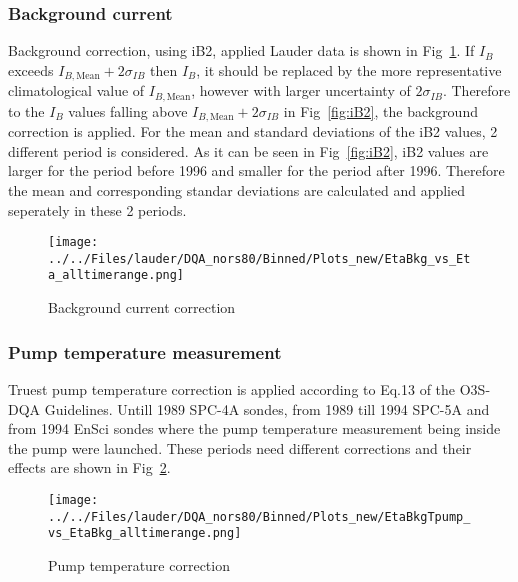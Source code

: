         \subsubsection{Background current}
        Background correction, using iB2, applied Lauder data is shown in Fig~\ref{fig:bkg}. If $I_B$ exceeds $I_{B,\text{Mean}}+2\sigma_{IB}$ then $I_B$, it
should be replaced by the more representative climatological value of $I_{B,\text{Mean}}$, however with
larger uncertainty of $2\sigma_{IB}$.
Therefore to the $I_B$ values falling above $I_{B,\text{Mean}}+2\sigma_{IB}$ in Fig~\ref{fig:iB2}, the background correction is applied. For the mean and standard deviations
of the iB2 values, 2 different period is considered. As it can be seen in Fig~\ref{fig:iB2}, iB2 values are larger for the period before 1996 and smaller for the period after
1996. Therefore the mean and corresponding standar deviations are calculated and applied seperately in these 2 periods.
%
%
                \begin{figure}
        \centering
\texttt{[image: ../../Files/lauder/DQA\_nors80/Binned/Plots\_new/EtaBkg\_vs\_Eta\_alltimerange.png]}
    \caption{Background current correction}
            \label{fig:bkg}
    \end{figure}
%
            \subsubsection{Pump temperature measurement}
 Truest pump temperature correction is applied according to Eq.13 of the O3S-DQA Guidelines. Untill 1989 SPC-4A sondes, from 1989 till 1994
 SPC-5A and from 1994 EnSci sondes where the pump temperature measurement being inside the pump  were launched.
 These periods need different corrections and their effects are shown in Fig~\ref{fig:tpump}.

%
                    \begin{figure}
        \centering
\texttt{[image: ../../Files/lauder/DQA\_nors80/Binned/Plots\_new/EtaBkgTpump\_vs\_EtaBkg\_alltimerange.png]}
    \caption{Pump temperature correction }
            \label{fig:tpump}
    \end{figure}
%
